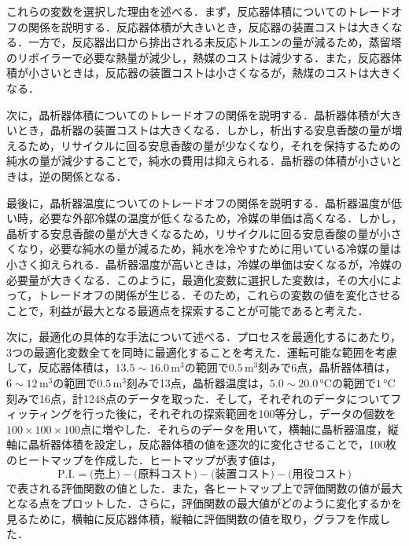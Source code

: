 \documentclass[a4j]{jsreport}
\begin{document}
これらの変数を選択した理由を述べる．まず，反応器体積についてのトレードオフの関係を説明する．反応器体積が大きいとき，反応器の装置コストは大きくなる．一方で，反応器出口から排出される未反応トルエンの量が減るため，蒸留塔のリボイラーで必要な熱量が減少し，熱媒のコストは減少する．また，反応器体積が小さいときは，反応器の装置コストは小さくなるが，熱煤のコストは大きくなる．

次に，晶析器体積についてのトレードオフの関係を説明する．晶析器体積が大きいとき，晶析器の装置コストは大きくなる．しかし，析出する安息香酸の量が増えるため，リサイクルに回る安息香酸の量が少なくなり，それを保持するための純水の量が減少することで，純水の費用は抑えられる．晶析器の体積が小さいときは，逆の関係となる．

最後に，晶析器温度についてのトレードオフの関係を説明する．晶析器温度が低い時，必要な外部冷媒の温度が低くなるため，冷媒の単価は高くなる．しかし，晶析する安息香酸の量が大きくなるため，リサイクルに回る安息香酸の量が小さくなり，必要な純水の量が減るため，純水を冷やすために用いている冷媒の量は小さく抑えられる．晶析器温度が高いときは，冷媒の単価は安くなるが，冷媒の必要量が大きくなる．このように，最適化変数に選択した変数は，その大小によって，トレードオフの関係が生じる．そのため，これらの変数の値を変化させることで，利益が最大となる最適点を探索することが可能であると考えた．

次に，最適化の具体的な手法について述べる．プロセスを最適化するにあたり，3つの最適化変数全てを同時に最適化することを考えた．運転可能な範囲を考慮して，反応器体積は，$13.5 \sim 16.0 \, \si{\cubic \metre}$の範囲で$0.5\,\si{\cubic \metre}$刻みで6点，晶析器体積は，$6 \sim 12 \, \si{\cubic \metre}$の範囲で$0.5\,\si{\cubic \metre}$刻みで13点，晶析器温度は，$5.0 \sim 20.0 \, \si{\degreeCelsius}$の範囲で$1\,\si{\degreeCelsius}$刻みで16点，計1248点のデータを取った．そして，それぞれのデータについてフィッティングを行った後に，それぞれの探索範囲を100等分し，データの個数を$100 \times 100 \times 100$点に増やした．それらのデータを用いて，横軸に晶析器温度，縦軸に晶析器体積を設定し，反応器体積の値を逐次的に変化させることで，100枚のヒートマップを作成した．ヒートマップが表す値は，
\begin{equation}
  \text{P.I.} = \text{(売上)} - \text{(原料コスト)} - \text{(装置コスト)} -\text{(用役コスト)}
\end{equation}
で表される評価関数の値とした．また，各ヒートマップ上で評価関数の値が最大となる点をプロットした．さらに，評価関数の最大値がどのように変化するかを見るために，横軸に反応器体積，縦軸に評価関数の値を取り，グラフを作成した．
\end{document}
